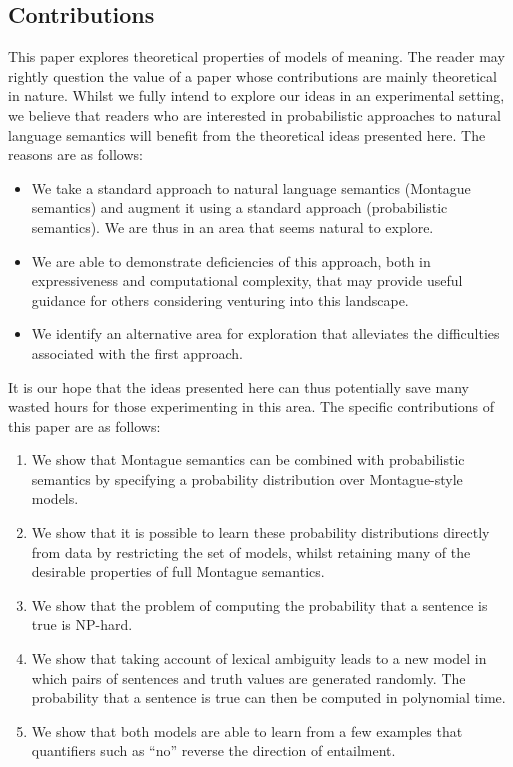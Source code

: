 \documentclass[11pt]{article}
\theoremstyle{definition}
\begin{document}
\subsection{Contributions}

This paper explores theoretical properties of models of meaning. The
reader may rightly question the value of a paper whose contributions
are mainly theoretical in nature. Whilst we fully intend to explore
our ideas in an experimental setting, we believe that readers who are
interested in probabilistic approaches to natural language semantics
will benefit from the theoretical ideas presented here. The reasons
are as follows:
\begin{itemize}
\item We take a standard approach to natural language semantics
  (Montague semantics) and augment it using a standard approach
  (probabilistic semantics). We are thus in an area that seems natural
  to explore.
\item We are able to demonstrate deficiencies of this approach, both
  in expressiveness and computational complexity, that may provide
  useful guidance for others considering venturing into this
  landscape.
\item We identify an alternative area for exploration that alleviates
  the difficulties associated with the first approach.
\end{itemize}
It is our hope that the ideas presented here can thus potentially save
many wasted hours for those experimenting in this area. The specific
contributions of this paper are as follows:
\begin{enumerate}
\item We show that Montague semantics can be combined with
  probabilistic semantics by specifying a probability distribution
  over Montague-style models.
\item We show that it is possible to learn these probability
  distributions directly from data by restricting the set of models,
  whilst retaining many of the desirable properties of full Montague
  semantics.
\item We show that the problem of computing the probability that a
  sentence is true is NP-hard.
\item We show that taking account of lexical ambiguity leads to a new
  model in which pairs of sentences and truth values are generated
  randomly. The probability that a sentence is true can then be
  computed in polynomial time.
\item We show that both models are able to learn from a few examples
  that quantifiers such as ``no'' reverse the direction of entailment.
\end{enumerate}
\end{document}
